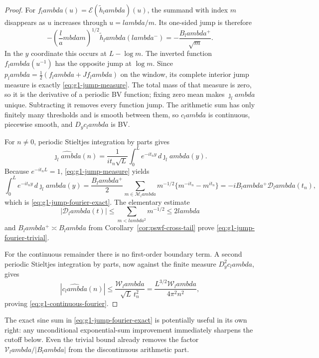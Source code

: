 \documentclass[11pt]{article}
\def\lambda{lambda}%
\theoremstyle{remark}
\begin{document}
\begin{proof}
For
$f_\lambda(u)=\mathcal E(\widetilde h_\lambda)(u)$, the summand with index
$m$ disappears as $u$ increases through $u=\lambda/m$.  Its one-sided jump is
therefore
\[
 -\left(\frac\lambda m\right)^{1/2}
  \widetilde h_\lambda(\lambda^-)
 =-\frac{B_\lambda^{+}}{\sqrt m}.
\]
In the $y$ coordinate this occurs at $L-\log m$.  The inverted function
$f_\lambda(u^{-1})$ has the opposite jump at $\log m$.  Since
$p_\lambda=\frac12(f_\lambda+Jf_\lambda)$ on the window, its complete
interior jump measure is exactly \eqref{eq:g1-jump-measure}.  The total mass
of that measure is zero, so it is the derivative of a periodic BV function;
fixing zero mean makes $\jmath_\lambda$ unique.  Subtracting it removes every
function jump.  The arithmetic sum has only finitely many thresholds and is
smooth between them, so $c_\lambda$ is continuous, piecewise smooth, and
$D_yc_\lambda$ is BV.

For $n\ne0$, periodic Stieltjes integration by parts gives
\[
 \widehat{\jmath_\lambda}(n)
 =\frac1{it_n\sqrt L}
 \int_0^Le^{-it_ny}\,d\jmath_\lambda(y).
\]
Because $e^{-it_nL}=1$, \eqref{eq:g1-jump-measure} yields
\[
 \int_0^Le^{-it_ny}\,d\jmath_\lambda(y)
 =\frac{B_\lambda^{+}}2
 \sum_{m\in\mathcal M_\lambda}m^{-1/2}
 \{m^{-it_n}-m^{it_n}\}
 =-iB_\lambda^{+}\mathcal D_\lambda(t_n),
\]
which is \eqref{eq:g1-jump-fourier-exact}.  The elementary estimate
\[
 |\mathcal D_\lambda(t)|
 \le\sum_{m<\lambda^2}m^{-1/2}\le2\lambda
\]
and $B_\lambda^{+}\asymp B_\lambda$ from
Corollary~\ref{cor:pswf-cross-tail} prove
\eqref{eq:g1-jump-fourier-trivial}.

For the continuous remainder there is no first-order boundary term.  A second
periodic Stieltjes integration by parts, now against the finite measure
$D_y^2c_\lambda$, gives
\[
 |\widehat{c_\lambda}(n)|
 \le\frac{\mathcal W_\lambda}{\sqrt L\,t_n^2}
 =\frac{L^{3/2}\mathcal W_\lambda}{4\pi^2n^2},
\]
proving \eqref{eq:g1-continuous-fourier}.
\end{proof}

The exact sine sum in \eqref{eq:g1-jump-fourier-exact} is potentially useful
in its own right: any unconditional exponential-sum improvement immediately
sharpens the cutoff below.  Even the trivial bound already removes the
factor $\mathcal V_\lambda/|B_\lambda|$ from the discontinuous arithmetic
part.
\end{document}
